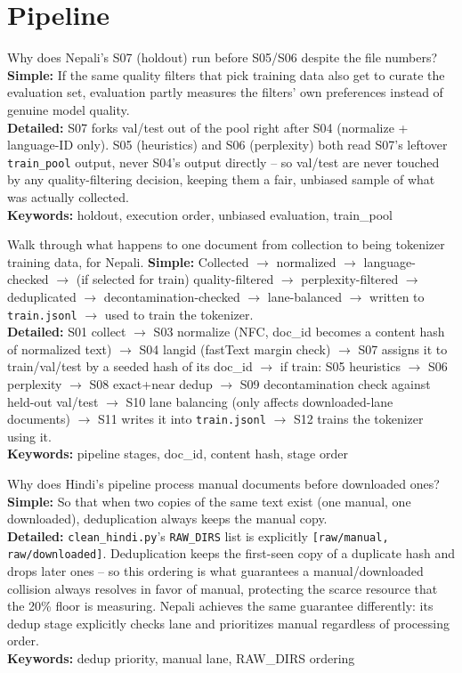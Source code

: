 \documentclass[11pt]{report}
\begin{document}
\section{Pipeline}

\begin{qabox}{Why does Nepali's S07 (holdout) run before S05/S06 despite
the file numbers?}
\textbf{Simple:} If the same quality filters that pick training data also
get to curate the evaluation set, evaluation partly measures the
filters' own preferences instead of genuine model quality.\\
\textbf{Detailed:} S07 forks val/test out of the pool right after S04
(normalize + language-ID only). S05 (heuristics) and S06 (perplexity)
both read S07's leftover \texttt{train\_pool} output, never S04's output
directly -- so val/test are never touched by any quality-filtering
decision, keeping them a fair, unbiased sample of what was actually
collected.\\
\textbf{Keywords:} holdout, execution order, unbiased evaluation, train\_pool
\end{qabox}

\begin{qabox}{Walk through what happens to one document from collection
to being tokenizer training data, for Nepali.}
\textbf{Simple:} Collected $\to$ normalized $\to$ language-checked $\to$
(if selected for train) quality-filtered $\to$ perplexity-filtered $\to$
deduplicated $\to$ decontamination-checked $\to$ lane-balanced $\to$
written to \texttt{train.jsonl} $\to$ used to train the tokenizer.\\
\textbf{Detailed:} S01 collect $\to$ S03 normalize (NFC, doc\_id becomes a
content hash of normalized text) $\to$ S04 langid (fastText margin check)
$\to$ S07 assigns it to train/val/test by a seeded hash of its doc\_id
$\to$ if train: S05 heuristics $\to$ S06 perplexity $\to$ S08 exact+near
dedup $\to$ S09 decontamination check against held-out val/test $\to$ S10
lane balancing (only affects downloaded-lane documents) $\to$ S11 writes
it into \texttt{train.jsonl} $\to$ S12 trains the tokenizer using it.\\
\textbf{Keywords:} pipeline stages, doc\_id, content hash, stage order
\end{qabox}

\begin{qabox}{Why does Hindi's pipeline process manual documents before
downloaded ones?}
\textbf{Simple:} So that when two copies of the same text exist (one
manual, one downloaded), deduplication always keeps the manual copy.\\
\textbf{Detailed:} \texttt{clean\_hindi.py}'s \texttt{RAW\_DIRS} list is
explicitly \texttt{[raw/manual, raw/downloaded]}. Deduplication keeps
the first-seen copy of a duplicate hash and drops later ones -- so this
ordering is what guarantees a manual/downloaded collision always resolves
in favor of manual, protecting the scarce resource that the 20\% floor
is measuring. Nepali achieves the same guarantee differently: its dedup
stage explicitly checks lane and prioritizes manual regardless of
processing order.\\
\textbf{Keywords:} dedup priority, manual lane, RAW\_DIRS ordering
\end{qabox}
\end{document}
